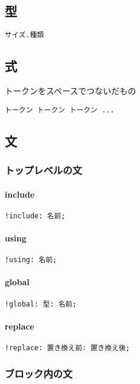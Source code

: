 \subsection{型}
\begin{lstlisting}[]
サイズ.種類
\end{lstlisting}

\subsection{式}
トークンをスペースでつないだもの
\begin{lstlisting}[]
トークン トークン トークン ...
\end{lstlisting}

\subsection{文}
    \subsubsection{トップレベルの文}
        \paragraph{include}
\begin{lstlisting}[]
!include: 名前;
\end{lstlisting}
        \paragraph{using}
\begin{lstlisting}[]
!using: 名前;
\end{lstlisting}
        \paragraph{global}
\begin{lstlisting}[]
!global: 型: 名前;
\end{lstlisting}
        \paragraph{replace}
\begin{lstlisting}[]
!replace: 置き換え前: 置き換え後;
\end{lstlisting}

    \subsubsection{ブロック内の文}
